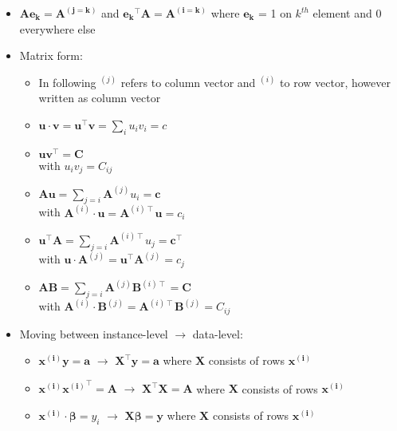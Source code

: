 \begin{itemize}
    \item $\boldsymbol{A} \boldsymbol{e_k} = \boldsymbol{A^{(j=k)}}$ and $\boldsymbol{e_k}^\intercal \boldsymbol{A} = \boldsymbol{A^{(i=k)}}$ where $\boldsymbol{e_k}$ = 1 on $k^{th}$ element and 0 everywhere else
    \item Matrix form:
    \begin{itemize}
        \item In following $^{(j)}$ refers to column vector and $^{(i)}$ to row vector, however written as column vector
        \item $\boldsymbol{u} \cdot \boldsymbol{v} = \boldsymbol{u}^\intercal \boldsymbol{v} = \sum_i u_i v_i = c$
        \item $\boldsymbol{u} \boldsymbol{v}^\intercal = \boldsymbol{C}$\\
        with $u_i v_j = C_{ij}$
        \item $\boldsymbol{A} \boldsymbol{u} = \sum_{j=i} \boldsymbol{A}^{(j)} u_i = \boldsymbol{c}$\\
        with $\boldsymbol{A}^{(i)} \cdot \boldsymbol{u} = \boldsymbol{A}^{(i) \intercal} \boldsymbol{u} = c_i$
        \item $\boldsymbol{u}^\intercal \boldsymbol{A} = \sum_{j=i} \boldsymbol{A}^{(i) \intercal} u_j = \boldsymbol{c}^\intercal$\\
        with $\boldsymbol{u} \cdot \boldsymbol{A}^{(j)} = \boldsymbol{u}^\intercal \boldsymbol{A}^{(j)} = c_j$
        \item $\boldsymbol{A} \boldsymbol{B} = \sum_{j=i} \boldsymbol{A}^{(j)} \boldsymbol{B}^{(i) \intercal} = \boldsymbol{C}$\\
        with $\boldsymbol{A}^{(i)} \cdot \boldsymbol{B}^{(j)} = \boldsymbol{A}^{(i) \intercal} \boldsymbol{B}^{(j)} = C_{ij}$
    \end{itemize}
    \item Moving between instance-level $\rightarrow$ data-level:
    \begin{itemize}
        \item $\boldsymbol{x^{(i)}} \boldsymbol{y} = \boldsymbol{a}$ $\rightarrow$ $\boldsymbol{X}^\intercal \boldsymbol{y} = \boldsymbol{a}$ where $\boldsymbol{X}$ consists of rows $\boldsymbol{x^{(i)}}$
        \item $\boldsymbol{x^{(i)}} \boldsymbol{x^{(i)}}^\intercal = \boldsymbol{A}$ $\rightarrow$ $\boldsymbol{X}^\intercal \boldsymbol{X} = \boldsymbol{A}$ where $\boldsymbol{X}$ consists of rows $\boldsymbol{x^{(i)}}$
        \item $\boldsymbol{x^{(i)}} \cdot \boldsymbol{\beta} = y_i$ $\rightarrow$ $\boldsymbol{X}\boldsymbol{\beta} = \boldsymbol{y}$ where $\boldsymbol{X}$ consists of rows $\boldsymbol{x^{(i)}}$
    \end{itemize}
\end{itemize}

